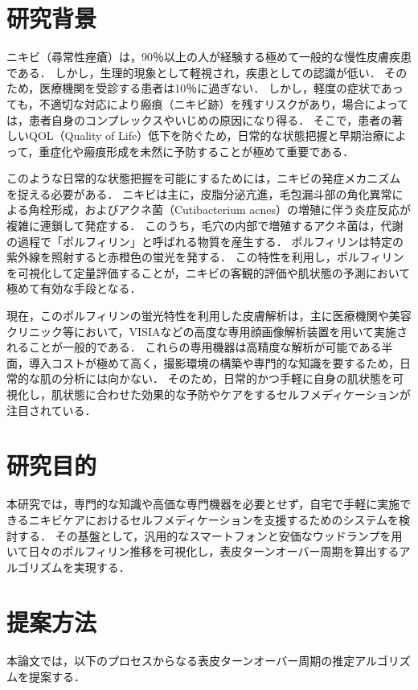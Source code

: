 \documentclass[book,paper=a4,fontsize=16pt,openany]{jlreq}
\begin{document}
\section{研究背景}
ニキビ（尋常性痤瘡）は，90％以上の人が経験する極めて一般的な慢性皮膚疾患である．
しかし，生理的現象として軽視され，疾患としての認識が低い．
そのため，医療機関を受診する患者は10％に過ぎない\cite{jda_guideline2023}．
しかし，軽度の症状であっても，不適切な対応により瘢痕（ニキビ跡）を残すリスクがあり，場合によっては，患者自身のコンプレックスやいじめの原因になり得る．
そこで，患者の著しいQOL（Quality of Life）低下を防ぐため，日常的な状態把握と早期治療によって，重症化や瘢痕形成を未然に予防することが極めて重要である．

このような日常的な状態把握を可能にするためには，ニキビの発症メカニズムを捉える必要がある．
ニキビは主に，皮脂分泌亢進，毛包漏斗部の角化異常による角栓形成，およびアクネ菌（Cutibacterium acnes）の増殖に伴う炎症反応が複雑に連鎖して発症する．
このうち，毛穴の内部で増殖するアクネ菌は，代謝の過程で「ポルフィリン」と呼ばれる物質を産生する．
ポルフィリンは特定の紫外線を照射すると赤橙色の蛍光を発する．
この特性を利用し，ポルフィリンを可視化して定量評価することが，ニキビの客観的評価や肌状態の予測において極めて有効な手段となる．

現在，このポルフィリンの蛍光特性を利用した皮膚解析は，主に医療機関や美容クリニック等において，VISIAなどの高度な専用顔画像解析装置を用いて実施されることが一般的である．
これらの専用機器は高精度な解析が可能である半面，導入コストが極めて高く，撮影環境の構築や専門的な知識を要するため，日常的な肌の分析には向かない．
そのため，日常的かつ手軽に自身の肌状態を可視化し，肌状態に合わせた効果的な予防やケアをするセルフメディケーションが注目されている．

\newpage
\section{研究目的}
本研究では，専門的な知識や高価な専門機器を必要とせず，自宅で手軽に実施できるニキビケアにおけるセルフメディケーションを支援するためのシステムを検討する．
その基盤として，汎用的なスマートフォンと安価なウッドランプを用いて日々のポルフィリン推移を可視化し，表皮ターンオーバー周期を算出するアルゴリズムを実現する．

\newpage
\section{提案方法}
本論文では，以下のプロセスからなる表皮ターンオーバー周期の推定アルゴリズムを提案する．
\end{document}
